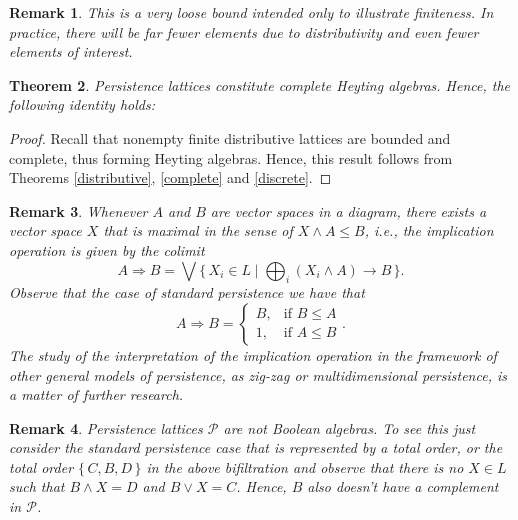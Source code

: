 \documentclass[10pt]{amsart}
\newtheorem{theorem}{Theorem}[section]
\newtheorem{remark}[theorem]{Remark}
\def \Pe{{\mathcal P}}
\newcommand{\set}[1]{\{\,#1\,\}}
\begin{document}
\begin{remark}
This is a very loose bound intended only to illustrate finiteness. In practice, there will be far fewer elements due to distributivity and even fewer elements of interest.  
\end{remark}




\begin{theorem}
Persistence lattices constitute complete Heyting algebras.
Hence, the following identity holds: 
\end{theorem}

\begin{proof}
Recall that nonempty finite distributive lattices are bounded and complete, thus forming Heyting algebras. 
Hence, this result follows from Theorems \ref{distributive}, \ref{complete} and \ref{discrete}.
\end{proof}

\begin{remark}
Whenever $A$ and $B$ are vector spaces in a diagram, there exists a vector space $X$ that is maximal in the sense of $X\wedge A\leq B$, i.e., the implication operation is given by the colimit 
\[
A \Rightarrow B=\bigvee \set{X_i\in L \mid \bigoplus_i (X_i\wedge A) \rightarrow B}.
\]
Observe that the case of standard persistence we have that 
\[
A\Rightarrow B = \begin{cases} B, & \mbox{if } B\leq A\\ 1, & \mbox{if } A\leq B \end{cases}.
\]
The study of the interpretation of the implication operation in the framework of other general models of persistence, as zig-zag or multidimensional persistence, is a matter of further research.
\end{remark}

\begin{remark}
Persistence lattices $\Pe$ are not Boolean algebras. 
To see this just consider the standard persistence case that is represented by a total order, or the total order $\set{C,B,D}$ in the above bifiltration and observe that there is no $X\in L$ such that $B\wedge X=D$ and $B\vee X=C$. Hence, $B$ also doesn't have a complement in $\Pe$.
\end{remark}
\end{document}

